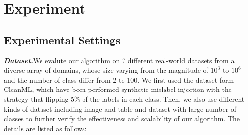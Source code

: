 \section{Experiment} 
\label{sec:exp}

\subsection{Experimental Settings}

\textbf{\textit{\underline{Dataset.}}}We evalute our algorithm on 7 different real-world datasets from a diverse array of domains, whose size varying from the magnitude of $10^{3}$ to $10^{6}$ and the number of class differ from 2 to 100. We first used the dataset form CleanML, which have been performed synthetic mislabel injection with the strategy that flipping 5\% of the labels in each class. Then, we also use different kinds of dataset including image and table and dataset with large number of classes to further verify the effectiveness and scalability of our algorithm. The details are listed as follows:

